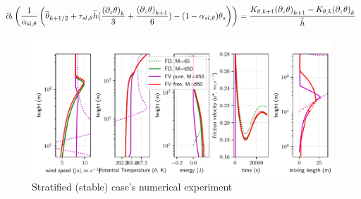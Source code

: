 \begin{equation}
	\label{eq:ND_StratifiedCase_semiDiscreteEkmanEqPTFVfree}
	\partial_t \left(\frac{1}{\alpha_{\rm sl, \theta}}
	\left(
	\overline{\theta}_{k+1/2} + \tau_{sl, \theta}
	\widetilde{h}(\frac{{(\partial_z \theta)}_k}{3} +
	\frac{{(\partial_z \theta)}_{k+1}}{6})
	 - (1 - \alpha_{sl, \theta})\theta_s
	\right) \right)
	= \frac{K_{\theta, k+1}{(\partial_z \theta)}_{k+1} -
	K_{\theta,k} {(\partial_z \theta)}_k}{\widetilde{h}}
\end{equation}

\begin{figure}
	\centering
	\includegraphics[scale=0.55]{images/consistency_comparisonStratified.pdf}
	\caption{Stratified (stable) case's numerical experiment}
	\label{fig:ND_StratifiedCase_NumericalExp}
\end{figure}

